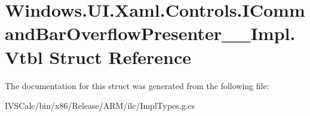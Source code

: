 \hypertarget{struct_windows_1_1_u_i_1_1_xaml_1_1_controls_1_1_i_command_bar_overflow_presenter_____impl_1_1_vtbl}{}\section{Windows.\+U\+I.\+Xaml.\+Controls.\+I\+Command\+Bar\+Overflow\+Presenter\+\_\+\+\_\+\+Impl.\+Vtbl Struct Reference}
\label{struct_windows_1_1_u_i_1_1_xaml_1_1_controls_1_1_i_command_bar_overflow_presenter_____impl_1_1_vtbl}


The documentation for this struct was generated from the following file\+:\begin{DoxyCompactItemize}
\item 
I\+V\+S\+Calc/bin/x86/\+Release/\+A\+R\+M/ilc/Impl\+Types.\+g.\+cs\end{DoxyCompactItemize}
